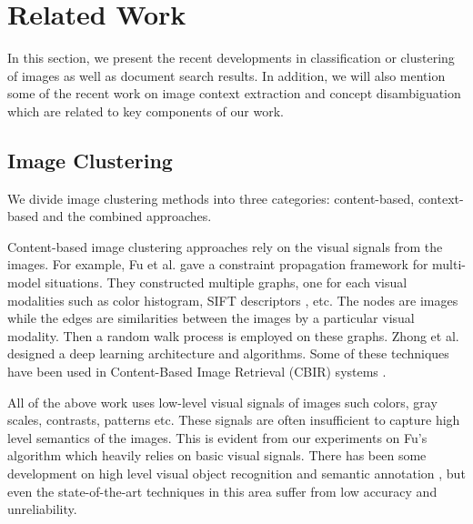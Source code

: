 \section{Related Work}
\label{sec:related}

\newcommand{\QS}[1]{\textcolor{magenta}{[Qingyu: #1]}}

In this section, we present the recent developments in classification or clustering
of images as well as document search results. In addition, we will also mention
some of the recent work on image context extraction and concept disambiguation
which are related to key components of our work.

\subsection{Image Clustering}

We divide image clustering methods into three categories:
content-based, context-based and the combined approaches.

Content-based image clustering approaches \cite{FergusFPZ05,FanGL07,GaoFLS08}
rely on the visual signals from the images.
For example, Fu et al.\cite{Fu2011} gave a constraint propagation
framework for multi-model situations. They constructed multiple graphs,
one for each visual modalities
such as color histogram, SIFT descriptors \cite{Lowe99}, etc. The nodes are images
while the edges are similarities between the images by a particular visual modality.
Then a random walk process is employed on these graphs.
Zhong et al.\cite{ZhongLL11} designed a deep learning architecture and algorithms.
Some of these techniques have been used in Content-Based Image Retrieval (CBIR)
systems \cite{Chang1984, Datta2008,ChenWK03,ChenWK05}.

All of the above work uses low-level visual signals of images such colors,
gray scales, contrasts, patterns etc. These signals are often insufficient
to capture high level semantics of the images. This is evident from our
experiments on Fu's algorithm which heavily relies on basic visual signals.
There has been some development on high level visual object recognition
and semantic annotation \cite{Li09scene}, but even the state-of-the-art
techniques in this area suffer from low accuracy and unreliability.

